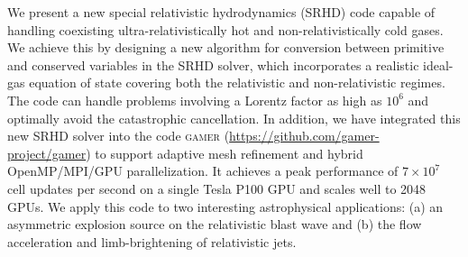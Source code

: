 \begin{abstracten}
We present a new special relativistic hydrodynamics (SRHD) code capable of handling coexisting
ultra-relativistically hot and non-relativistically cold gases.
We achieve this by designing a new algorithm for conversion between primitive and
conserved variables in the SRHD solver, which incorporates a realistic ideal-gas
equation of state covering both the relativistic and non-relativistic regimes.
The code can handle problems involving a Lorentz factor as high as $10^6$ and optimally
avoid the catastrophic cancellation. In addition, we have integrated this new SRHD solver
into the code \textsc{gamer} (\url{https://github.com/gamer-project/gamer}) to support
adaptive mesh refinement and hybrid OpenMP/MPI/GPU parallelization.
It achieves a peak performance of $7\times 10^{7}$ cell updates per second on a
single Tesla P100 GPU and scales well to 2048 GPUs. We apply this code
to two interesting astrophysical applications: (a) an asymmetric explosion source
on the relativistic blast wave and (b) the flow acceleration and limb-brightening of
relativistic jets.


\end{abstracten}
